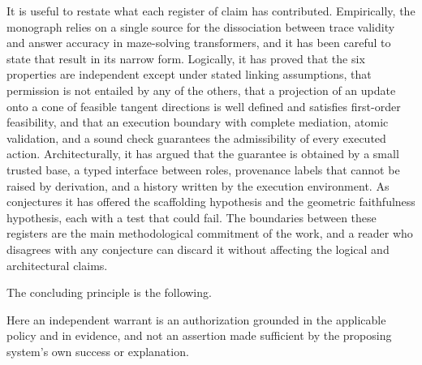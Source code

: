 It is useful to restate what each register of claim has contributed. Empirically, the monograph relies on a single source for the dissociation between trace validity and answer accuracy in maze-solving transformers, and it has been careful to state that result in its narrow form. Logically, it has proved that the six properties are independent except under stated linking assumptions, that permission is not entailed by any of the others, that a projection of an update onto a cone of feasible tangent directions is well defined and satisfies first-order feasibility, and that an execution boundary with complete mediation, atomic validation, and a sound check guarantees the admissibility of every executed action. Architecturally, it has argued that the guarantee is obtained by a small trusted base, a typed interface between roles, provenance labels that cannot be raised by derivation, and a history written by the execution environment. As conjectures it has offered the scaffolding hypothesis and the geometric faithfulness hypothesis, each with a test that could fail. The boundaries between these registers are the main methodological commitment of the work, and a reader who disagrees with any conjecture can discard it without affecting the logical and architectural claims.

The concluding principle is the following.
\begin{center}
\end{center}
Here an independent warrant is an authorization grounded in the applicable policy and in evidence, and not an assertion made sufficient by the proposing system's own success or explanation.
